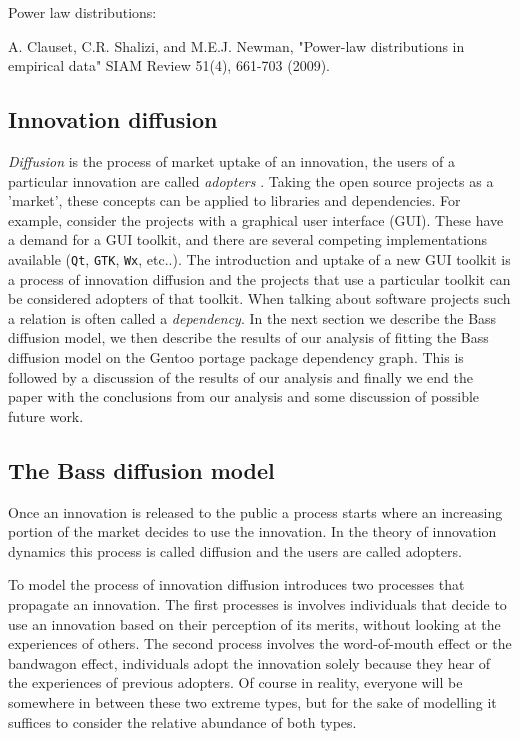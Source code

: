 \documentclass[smallextended,final]{svjour3}
\begin{document}
Power law distributions:

A. Clauset, C.R. Shalizi, and M.E.J. Newman, "Power-law distributions in empirical data" SIAM Review 51(4), 661-703 (2009).

\subsection{Innovation diffusion}

\emph{Diffusion} is the process of market uptake of an innovation, the users of a particular innovation are called \emph{adopters} \citep{narayanan01}. Taking the open source projects as a 'market', these concepts can be applied to libraries and dependencies. For example, consider the projects with a graphical user interface (GUI). These have a demand for a GUI toolkit, and there are several competing implementations available (\verb|Qt|, \verb|GTK|, \verb|Wx|, etc..). The introduction and uptake of a new GUI toolkit is a process of innovation diffusion and the projects that use a particular toolkit can be considered adopters of that toolkit. When talking about software projects such a relation is often called a \emph{dependency}.
In the next section we describe the Bass \citep{bass69}  diffusion model, we then describe the results of our analysis of fitting the Bass diffusion model on the Gentoo portage package dependency graph. This is followed by a discussion of the results of our analysis and finally we end the paper with the conclusions from our analysis and some discussion of possible future work.



\subsection{The Bass diffusion model}\label{sect:Bass}

Once an innovation is released to the public a process starts where an increasing portion of the market decides to use the innovation. In the theory of innovation dynamics this process is called diffusion and the users are called adopters. \citep[see][chapter 4]{narayanan01}

To model the process of innovation diffusion \cite{bass69} introduces two processes that propagate an innovation. The first processes is involves individuals that decide to use an innovation based on their perception of its merits, without looking at the experiences of others. The second process involves the word-of-mouth effect or the bandwagon effect, individuals adopt the innovation solely because they hear of the experiences of previous adopters. Of course in reality, everyone will be somewhere in between these two extreme types, but for the sake of modelling it suffices to consider the relative abundance of both types.
\end{document}
